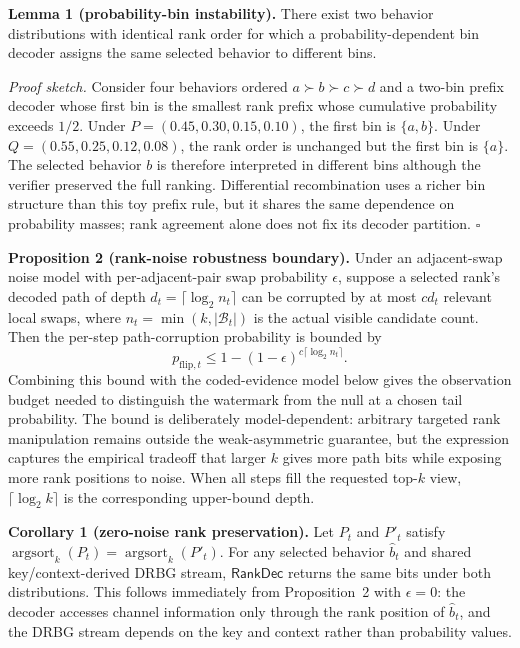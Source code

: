 \documentclass[conference,compsoc]{IEEEtran}
\newcommand{\RankDec}{\ensuremath{\mathsf{RankDec}}}
\newcommand{\B}{\mathcal{B}}
\begin{document}
\textbf{Lemma 1 (probability-bin instability).}
There exist two behavior distributions with identical rank order for which a probability-dependent bin decoder assigns the same selected behavior to different bins.

\emph{Proof sketch.}
Consider four behaviors ordered $a\succ b\succ c\succ d$ and a two-bin prefix decoder whose first bin is the smallest rank prefix whose cumulative probability exceeds $1/2$. Under $P=(0.45,0.30,0.15,0.10)$, the first bin is $\{a,b\}$. Under $Q=(0.55,0.25,0.12,0.08)$, the rank order is unchanged but the first bin is $\{a\}$. The selected behavior $b$ is therefore interpreted in different bins although the verifier preserved the full ranking. Differential recombination uses a richer bin structure than this toy prefix rule, but it shares the same dependence on probability masses; rank agreement alone does not fix its decoder partition. \hfill$\square$

\textbf{Proposition 2 (rank-noise robustness boundary).}
Under an adjacent-swap noise model with per-adjacent-pair swap probability $\epsilon$, suppose a selected rank's decoded path of depth $d_t=\lceil\log_2 n_t\rceil$ can be corrupted by at most $c d_t$ relevant local swaps, where $n_t=\min(k,|\B_t|)$ is the actual visible candidate count. Then the per-step path-corruption probability is bounded by
\begin{equation}
  p_{\mathrm{flip},t} \leq 1-(1-\epsilon)^{c\lceil\log_2 n_t\rceil}.
\end{equation}
Combining this bound with the coded-evidence model below gives the observation budget needed to distinguish the watermark from the null at a chosen tail probability. The bound is deliberately model-dependent: arbitrary targeted rank manipulation remains outside the weak-asymmetric guarantee, but the expression captures the empirical tradeoff that larger $k$ gives more path bits while exposing more rank positions to noise. When all steps fill the requested top-$k$ view, $\lceil\log_2 k\rceil$ is the corresponding upper-bound depth.

\textbf{Corollary 1 (zero-noise rank preservation).}
Let $P_t$ and $P'_t$ satisfy $\operatorname{argsort}_k(P_t)=\operatorname{argsort}_k(P'_t)$. For any selected behavior $\hat b_t$ and shared key/context-derived DRBG stream, \RankDec{} returns the same bits under both distributions. This follows immediately from Proposition~2 with $\epsilon=0$: the decoder accesses channel information only through the rank position of $\hat b_t$, and the DRBG stream depends on the key and context rather than probability values.
\end{document}
